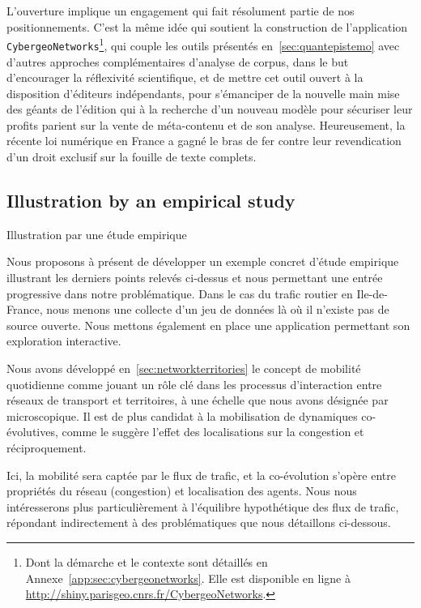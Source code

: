 L'ouverture implique un engagement qui fait résolument partie de nos positionnements. C'est la même idée qui soutient la construction de l'application \texttt{CybergeoNetworks}\footnote{Dont la démarche et le contexte sont détaillés en Annexe~\ref{app:sec:cybergeonetworks}. Elle est disponible en ligne à \url{http://shiny.parisgeo.cnrs.fr/CybergeoNetworks}.}, qui couple les outils présentés en~\ref{sec:quantepistemo} avec d'autres approches complémentaires d'analyse de corpus, dans le but d'encourager la réflexivité scientifique, et de mettre cet outil ouvert à la disposition d'éditeurs indépendants, pour s'émanciper de la nouvelle main mise des géants de l'édition qui à la recherche d'un nouveau modèle pour sécuriser leur profits parient sur la vente de méta-contenu et de son analyse. Heureusement, la récente loi numérique en France a gagné le bras de fer contre leur revendication d'un droit exclusif sur la fouille de texte complets.








\subsection{Illustration by an empirical study}{Illustration par une étude empirique}



Nous proposons à présent de développer un exemple concret d'étude empirique illustrant les derniers points relevés ci-dessus et nous permettant une entrée progressive dans notre problématique. Dans le cas du trafic routier en Ile-de-France, nous menons une collecte d'un jeu de données là où il n'existe pas de source ouverte. Nous mettons également en place une application permettant son exploration interactive.


Nous avons développé en~\ref{sec:networkterritories} le concept de mobilité quotidienne comme jouant un rôle clé dans les processus d'interaction entre réseaux de transport et territoires, à une échelle que nous avons désignée par microscopique. Il est de plus candidat à la mobilisation de dynamiques co-évolutives, comme le suggère l'effet des localisations sur la congestion et réciproquement.

Ici, la mobilité sera captée par le flux de trafic, et la co-évolution s'opère entre propriétés du réseau (congestion) et localisation des agents. Nous nous intéresserons plus particulièrement à l'équilibre hypothétique des flux de trafic, répondant indirectement à des problématiques que nous détaillons ci-dessous. 



